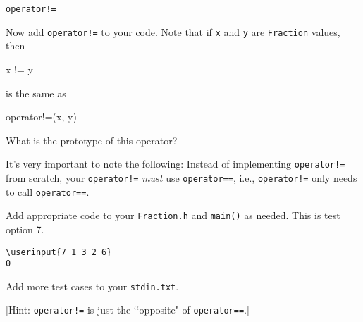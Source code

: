 \verb~operator!=~

Now add \verb~operator!=~ to your code. Note that if \verb!x! and \verb!y! are
\verb!Fraction! values, then
\begin{console}
x != y
\end{console}
is the same as
\begin{console}
operator!=(x, y)
\end{console}

What is the prototype of this operator?

It's very important to note the following: Instead of implementing
\verb~operator!=~ from scratch, your \verb~operator!=~ \textit{must} use
\verb!operator==!, i.e., \verb~operator!=~ only needs to call
\verb!operator==!.

Add appropriate code to your \verb!Fraction.h! and \verb!main()! as needed.
This is test option 7.

\resett
\nextt
\begin{Verbatim}[frame=single, commandchars=\\\{\}]
\userinput{7 1 3 2 6}
0
\end{Verbatim}

Add more test cases to your \verb!stdin.txt!.

[Hint: \verb~operator!=~ is just the \lq\lq opposite" of \verb!operator==!.]
